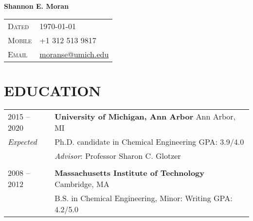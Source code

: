 \documentclass[11pt]{article}
\begin{document}


{\LARGE\textbf{Shannon E. Moran}}

\begin{tabular}{R{2.2cm}L{14.8cm}}
    \textsc{Dated}     &  \today \\
    \textsc{Mobile}     & +1 312 513 9817\\
    \textsc{Email}     & \href{mailto:moranse@umich.edu}{moranse@umich.edu} \\
\end{tabular}
\vspace{-0.5em}


\section{EDUCATION}
\begin{longtable}{R{2.2cm}L{14.8cm}}
2015 -- 2020 & \textbf{University of Michigan, Ann Arbor} \hfill Ann Arbor, MI \\
\textit{Expected} & Ph.D. candidate in Chemical Engineering \hfill GPA: 3.9/4.0 \\
& \textit{Advisor}: Professor Sharon C. Glotzer \\
\\
2008 -- 2012 & \textbf{Massachusetts Institute of Technology} \hfill Cambridge, MA \\
& B.S. in Chemical Engineering, Minor: Writing \hfill GPA: 4.2/5.0\\
\end{longtable}
\end{document}
